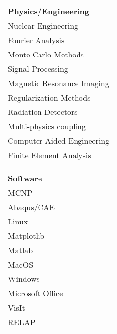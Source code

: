 \\[2mm]
\begin{minipage}{0.32\textwidth}
\begin{tabular}{l}
	{\large\textbf{Physics/Engineering}} \\
	\highskillcolor Nuclear Engineering \\
	\highskillcolor Fourier Analysis \\ 
	\highskillcolor Monte Carlo Methods \\
	\medskillcolor Signal Processing \\
	\medskillcolor Magnetic Resonance Imaging \\ 
	\medskillcolor Regularization Methods  \\
	\medskillcolor Radiation Detectors \\
	\lowskillcolor Multi-physics coupling \\
	\lowskillcolor Computer Aided Engineering \\
	\lowskillcolor Finite Element Analysis \\
\end{tabular}
\end{minipage}%
\begin{minipage}{0.20\textwidth}
	\begin{center}
\begin{tabular}{l}
	{\large\textbf{Software}} \\
	\highskillcolor \textsc{MCNP} \\
	\highskillcolor Abaqus/CAE \\
	\highskillcolor Linux \\ 
	\highskillcolor Matplotlib \\ 
	\highskillcolor Matlab \\
	\highskillcolor MacOS \\
	\medskillcolor Windows \\
	\medskillcolor Microsoft Office \\
	\lowskillcolor VisIt \\
	\lowskillcolor RELAP
\end{tabular}
	\end{center}
\end{minipage}%
